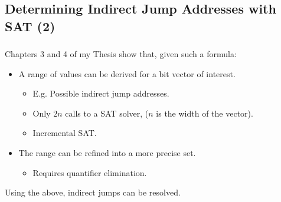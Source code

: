 \documentclass[compress]{beamer}
\begin{document}
\subsection{Determining Indirect Jump Addresses with SAT (2)}
\begin{frame}[fragile]
	\frametitle{\insertsubsection}

	Chapters 3 and 4 of my Thesis show that, given such a formula:

	\vfill

	\begin{itemize}
	\item A range of values can be derived for a bit vector of interest.
		\begin{itemize}
		\item E.g. Possible indirect jump addresses.
		\item Only $2n$ calls to a SAT solver, ($n$ is the width of the vector).
		\item Incremental SAT.
		\end{itemize}

		\vfill

	\item The range can be refined into a more precise set.
		\begin{itemize}
		\item Requires quantifier elimination.
		\end{itemize}
	\end{itemize}

	\vfill

	Using the above, indirect jumps can be resolved.

\end{frame}
\end{document}
